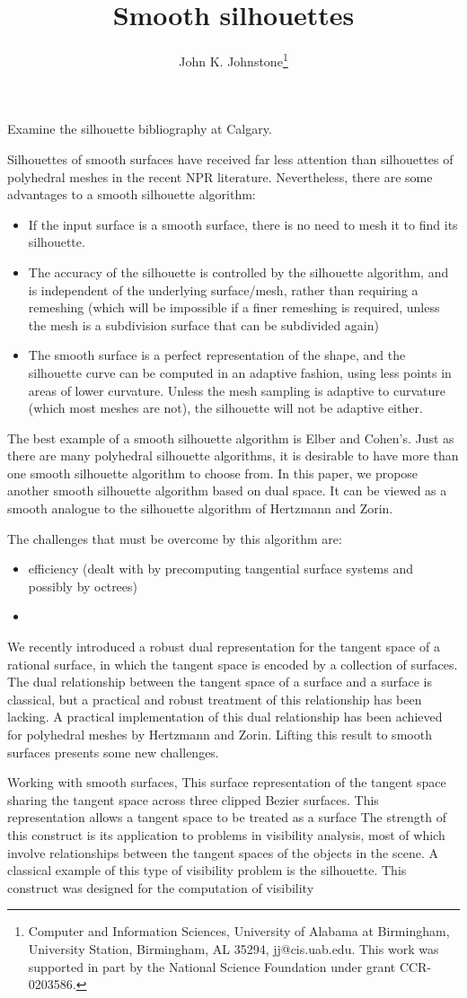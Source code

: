 \documentclass[12pt]{article}
\title{Smooth silhouettes}
\author{John K. Johnstone\thanks{Computer and Information Sciences,
University of Alabama at Birmingham,
University Station, Birmingham, AL 35294, jj@cis.uab.edu.
This work was supported in part by the National Science Foundation
under grant CCR-0203586.}}
\begin{document}
\maketitle

Examine the silhouette bibliography at Calgary.

Silhouettes of smooth surfaces have received far less attention than silhouettes of polyhedral
meshes in the recent NPR literature.
Nevertheless, there are some advantages to a smooth silhouette algorithm:
\begin{itemize}
\item If the input surface is a smooth surface, there is no need to mesh it to find its silhouette.
\item The accuracy of the silhouette is controlled by the silhouette algorithm, and is 
      independent of the underlying surface/mesh,
      rather than requiring a remeshing (which will be impossible if a finer remeshing is required,
      unless the mesh is a subdivision surface that can be subdivided again)
\item The smooth surface is a perfect representation of the shape, and the silhouette curve can
      be computed in an adaptive fashion, using less points in areas of lower curvature.
      Unless the mesh sampling is adaptive to curvature (which most meshes are not),
      the silhouette will not be adaptive either.
\end{itemize}
The best example of a smooth silhouette algorithm is Elber and Cohen's.
Just as there are many polyhedral silhouette algorithms, it is desirable to have more than one
smooth silhouette algorithm to choose from.
In this paper, we propose another smooth silhouette algorithm based on dual space.
It can be viewed as a smooth analogue to the silhouette algorithm of Hertzmann and Zorin.

The challenges that must be overcome by this algorithm are:
\begin{itemize}
\item efficiency (dealt with by precomputing tangential surface systems and possibly by octrees)
\item 
\end{itemize}

We recently introduced a robust dual representation for the tangent space of a rational surface,
in which the tangent space is encoded by a collection of surfaces.
The dual relationship between the tangent space of a surface and a surface is classical,
but a practical and robust treatment of this relationship has been lacking.
A practical implementation of this dual relationship has been achieved for polyhedral meshes
by Hertzmann and Zorin.
Lifting this result to smooth surfaces presents some new challenges.

Working with smooth surfaces, 
This surface representation of the tangent space 
sharing the tangent space across three clipped Bezier surfaces.
This representation allows a tangent space to be treated as a surface
The strength of this construct is its application to problems in visibility analysis, 
most of which involve relationships between the tangent spaces of the objects in the scene.
A classical example of this type of visibility problem is the silhouette.
This construct was designed for the computation of visibility 
\end{document}
